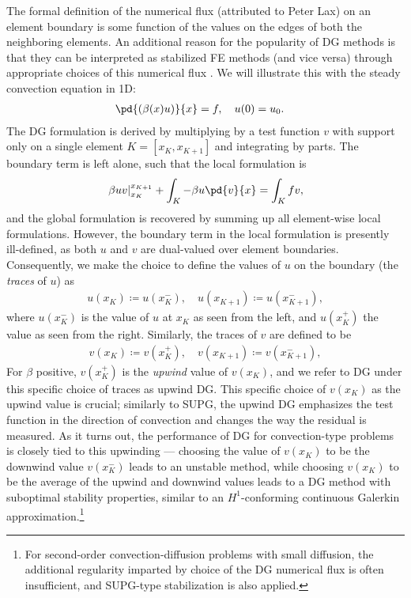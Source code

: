 The formal definition of the numerical flux (attributed to Peter Lax) on an element boundary is some function of the values on the edges of both the neighboring elements.  An additional reason for the popularity of DG methods is that they can be interpreted as stabilized FE methods (and vice versa) through appropriate choices of this numerical flux \cite{Brezzi20063293}. We will illustrate this with the steady convection equation in 1D:
\begin{align*}
\pd{\left(\beta(x) u\right)}{x} = f, \quad u(0) &= u_0.
\end{align*}
The DG formulation is derived by multiplying by a test function $v$ with support only on a single element $K = [x_K,x_{K+1}]$ and integrating by parts. The boundary term is left alone, such that the local formulation is 
\[
\left.\beta u v\right|_{x_K}^{x_{K+1}} + \int_K -\beta u \pd{v}{x} = \int_K f v,
\]
and the global formulation is recovered by summing up all element-wise local formulations. However, the boundary term in the local formulation is presently ill-defined, as both $u$ and $v$ are dual-valued over element boundaries. Consequently, we make the choice to define the values of $u$ on the boundary (the \emph{traces} of $u$) as
\begin{align*}
u(x_K) \coloneqq u(x_K^-), \quad u(x_{K+1}) \coloneqq u(x_{K+1}^-),
\end{align*}
where $u(x_K^-)$ is the value of $u$ at $x_K$ as seen from the left, and $u(x_K^+)$ the value as seen from the right. Similarly, the traces of $v$ are defined to be
\begin{align*}
v(x_K) \coloneqq v(x_K^+), \quad v(x_{K+1}) \coloneqq v(x_{K+1}^-),
\end{align*}
For $\beta$ positive, $v(x_K^+)$ is the \emph{upwind} value of $v(x_K)$, and we refer to DG under this specific choice of traces as upwind DG.  This specific choice of $v(x_K)$ as the upwind value is crucial; similarly to SUPG, the upwind DG emphasizes the test function in the direction of convection and changes the way the residual is measured.  As it turns out, the performance of DG for convection-type problems is closely tied to this upwinding --- choosing the value of $v(x_K)$ to be the downwind value $v(x_K^-)$ leads to an unstable method, while choosing $v(x_K)$ to be the average of the upwind and downwind values leads to a DG method with suboptimal stability properties, similar to an $H^1$-conforming continuous Galerkin approximation\cite{Brezzi20063293}.\footnote{For second-order convection-diffusion problems with small diffusion, the additional regularity imparted by choice of the DG numerical flux is often insufficient, and SUPG-type stabilization is also applied.}

